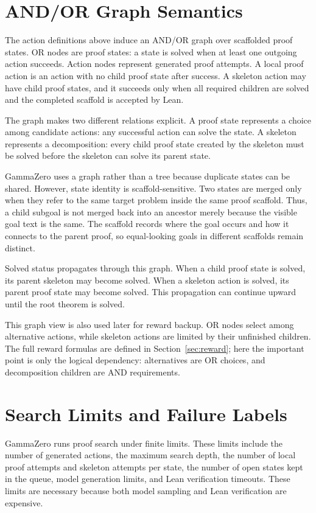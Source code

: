 \documentclass[en]{uet_awesome_thesis/uet-awesome-thesis}
\begin{document}
\section{AND/OR Graph Semantics}

The action definitions above induce an AND/OR graph over scaffolded proof states. OR nodes are proof states: a state is solved when at least one outgoing action succeeds. Action nodes represent generated proof attempts. A local proof action is an action with no child proof state after success. A skeleton action may have child proof states, and it succeeds only when all required children are solved and the completed scaffold is accepted by Lean.

The graph makes two different relations explicit. A proof state represents a choice among candidate actions: any successful action can solve the state. A skeleton represents a decomposition: every child proof state created by the skeleton must be solved before the skeleton can solve its parent state.

GammaZero uses a graph rather than a tree because duplicate states can be shared. However, state identity is scaffold-sensitive. Two states are merged only when they refer to the same target problem inside the same proof scaffold. Thus, a child subgoal is not merged back into an ancestor merely because the visible goal text is the same. The scaffold records where the goal occurs and how it connects to the parent proof, so equal-looking goals in different scaffolds remain distinct.

Solved status propagates through this graph. When a child proof state is solved, its parent skeleton may become solved. When a skeleton action is solved, its parent proof state may become solved. This propagation can continue upward until the root theorem is solved.

This graph view is also used later for reward backup. OR nodes select among alternative actions, while skeleton actions are limited by their unfinished children. The full reward formulas are defined in Section~\ref{sec:reward}; here the important point is only the logical dependency: alternatives are OR choices, and decomposition children are AND requirements.

\section{Search Limits and Failure Labels}

GammaZero runs proof search under finite limits. These limits include the number of generated actions, the maximum search depth, the number of local proof attempts and skeleton attempts per state, the number of open states kept in the queue, model generation limits, and Lean verification timeouts. These limits are necessary because both model sampling and Lean verification are expensive.
\end{document}
